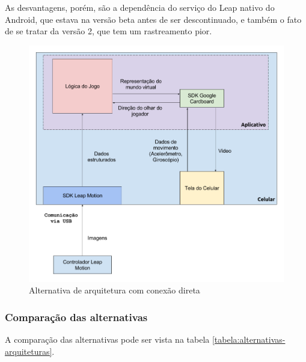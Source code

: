 As desvantagens, porém, são a dependência do serviço do Leap nativo do Android, que estava na versão beta antes de ser descontinuado, e também o fato de se tratar da versão 2, que tem um rastreamento pior.

\begin{figure}
	\centering
	\includegraphics[width=0.7\linewidth]{images/Arquitetura-leap-android}
	\caption{Alternativa de arquitetura com conexão direta}
	\label{fig:arquitetura-leap-android}
\end{figure}

\subsubsection{Comparação das alternativas}\label{subsubsec-arquiteturas-comparacao}

A comparação das alternativas pode ser vista na tabela \ref{tabela:alternativas-arquiteturas}.

